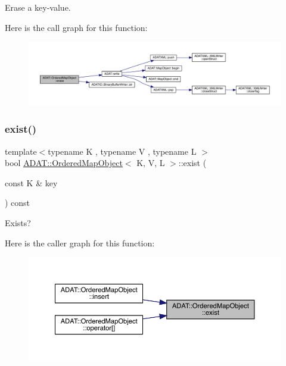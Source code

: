 Erase a key-\/value. 

Here is the call graph for this function\+:
\nopagebreak
\begin{figure}[H]
\begin{center}
\leavevmode
\includegraphics[width=350pt]{db/d8c/classADAT_1_1OrderedMapObject_af5d9aad7f7a1ce462dfed9cbe13c638c_cgraph}
\end{center}
\end{figure}
\mbox{\label{classADAT_1_1OrderedMapObject_a1300311ab06f03aba77a5911d0017caf}} 
\subsubsection{\texorpdfstring{exist()}{exist()}\hspace{0.1cm}{\footnotesize\ttfamily [1/2]}}
{\footnotesize\ttfamily template$<$typename K , typename V , typename L $>$ \\
bool \mbox{\hyperlink{classADAT_1_1OrderedMapObject}{A\+D\+A\+T\+::\+Ordered\+Map\+Object}}$<$ K, V, L $>$\+::exist (\begin{DoxyParamCaption}\item[{const K \&}]{key }\end{DoxyParamCaption}) const\hspace{0.3cm}{\ttfamily [inline]}}



Exists? 

Here is the caller graph for this function\+:
\nopagebreak
\begin{figure}[H]
\begin{center}
\leavevmode
\includegraphics[width=350pt]{db/d8c/classADAT_1_1OrderedMapObject_a1300311ab06f03aba77a5911d0017caf_icgraph}
\end{center}
\end{figure}
\mbox{\label{classADAT_1_1OrderedMapObject_a1300311ab06f03aba77a5911d0017caf}} 
